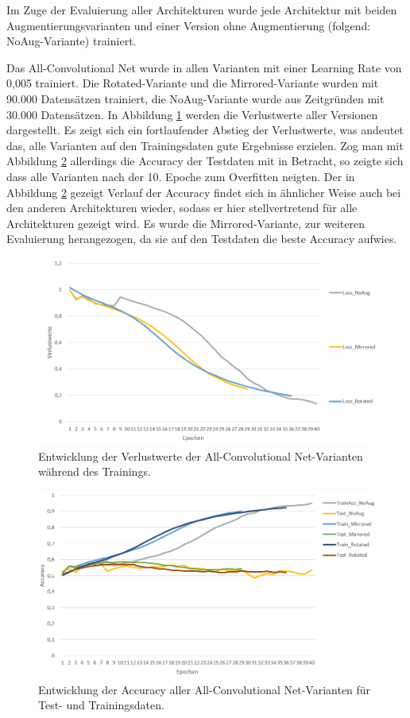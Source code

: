 Im Zuge der Evaluierung aller Architekturen wurde jede Architektur mit beiden Augmentierungsvarianten und einer Version ohne Augmentierung (folgend: NoAug-Variante) trainiert. 

Das All-Convolutional Net wurde in allen Varianten mit einer Learning Rate von 0,005 trainiert. Die Rotated-Variante und die Mirrored-Variante wurden mit 90.000 Datensätzen trainiert, die NoAug-Variante wurde aus Zeitgründen mit 30.000 Datensätzen. In Abbildung \ref{fig:loss_allconv} werden die Verlustwerte aller Versionen dargestellt. Es zeigt sich ein fortlaufender Abstieg der Verlustwerte, was andeutet das, alle Varianten auf den Trainingsdaten gute Ergebnisse erzielen. Zog man mit Abbildung \ref{fig:acc_allconv} allerdings die Accuracy der Testdaten mit in Betracht, so zeigte sich dass alle Varianten nach der 10. Epoche zum Overfitten neigten. Der in Abbildung \ref{fig:acc_allconv} gezeigt Verlauf der Accuracy findet sich in ähnlicher Weise auch bei den anderen Architekturen wieder, sodass er hier stellvertretend für alle Architekturen gezeigt wird. Es wurde die Mirrored-Variante, zur weiteren Evaluierung herangezogen, da sie auf den Testdaten die beste Accuracy aufwies. 

\begin{figure}[H]
\centering
\includegraphics[scale=0.5]{pictures/Auswertung/all_conv_loss}
\caption{Entwicklung der Verlustwerte der All-Convolutional Net-Varianten während des Trainings.}
\label{fig:loss_allconv}
\end{figure}
\begin{figure}[H]
\centering
\includegraphics[scale=0.5]{pictures/Auswertung/all_conv_acc_}
\caption{Entwicklung der Accuracy aller All-Convolutional Net-Varianten für Test- und Trainingsdaten.}
\label{fig:acc_allconv}
\end{figure}

